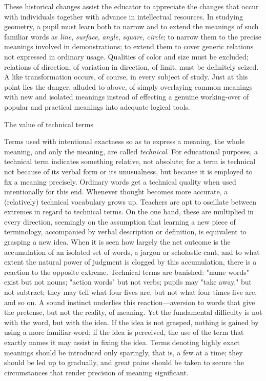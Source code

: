 \documentclass[letterpaper]{book}
\begin{document}
These historical changes assist the educator to appreciate the changes
that occur with individuals together with advance in intellectual
resources. In
studying
geometry, a pupil must learn both to narrow and to extend the meanings
of such familiar words as \emph{line}, \emph{surface}, \emph{angle},
\emph{square}, \emph{circle}; to narrow them to the precise meanings
involved in demonstrations; to extend them to cover generic relations
not expressed in ordinary usage. Qualities of color and size must be
excluded; relations of direction, of variation in direction, of limit,
must be definitely seized. A like transformation occurs, of course, in
every subject of study. Just at this point lies the danger, alluded to
above, of simply overlaying common meanings with new and isolated
meanings instead of effecting a genuine working-over of popular and
practical meanings into adequate logical tools.

The value of technical terms

Terms used with intentional exactness so as to express a meaning, the
whole meaning, and only the meaning, are called \emph{technical}. For
educational purposes, a technical term indicates something relative, not
absolute; for a term is technical not because of its verbal form or its
unusualness, but because it is employed to fix a meaning precisely.
Ordinary words get a technical quality when used intentionally for this
end. Whenever thought becomes more accurate, a (relatively) technical
vocabulary grows up. Teachers are apt to oscillate between extremes in
regard to technical terms. On the one hand, these are multiplied in
every direction, seemingly on the assumption that learning a new piece
of terminology, accompanied by verbal description or definition, is
equivalent to grasping a new idea. When it is seen how largely the net
outcome is the accumulation of an isolated set of words, a jargon or
scholastic cant, and to what extent the natural power of judgment is
clogged by this accumulation, there is a reaction to the opposite
extreme. Technical terms are
banished:
"name words" exist but not nouns; "action words" but not verbs; pupils
may "take away," but not subtract; they may tell what four fives are,
but not what four times five are, and so on. A sound instinct underlies
this reaction---aversion to words that give the pretense, but not the
reality, of meaning. Yet the fundamental difficulty is not with the
word, but with the idea. If the idea is not grasped, nothing is gained
by using a more familiar word; if the idea is perceived, the use of the
term that exactly names it may assist in fixing the idea. Terms denoting
highly exact meanings should be introduced only sparingly, that is, a
few at a time; they should be led up to gradually, and great pains
should be taken to secure the circumstances that render precision of
meaning significant.
\end{document}
